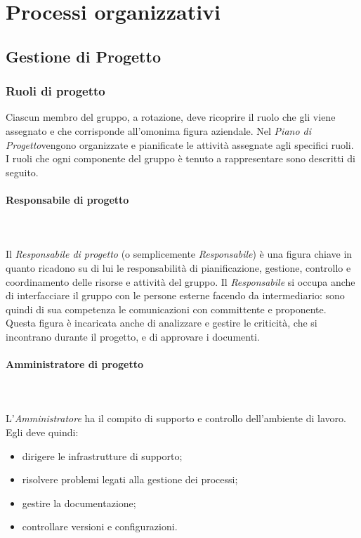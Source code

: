 \section{Processi organizzativi}

\subsection{Gestione di Progetto}

\subsubsection{Ruoli di progetto}
Ciascun membro del gruppo, a rotazione, deve ricoprire il ruolo che gli viene assegnato e che corrisponde all'omonima figura aziendale. Nel \textit{Piano di Progetto}\glo vengono organizzate e pianificate le attività assegnate agli specifici ruoli. I ruoli che ogni componente del gruppo è tenuto a rappresentare sono descritti di seguito.

\paragraph{Responsabile di progetto}\mbox{} \\ \mbox{} \\
Il \textit{Responsabile di progetto} (o semplicemente \textit{Responsabile}) è una figura chiave in quanto ricadono su di lui le responsabilità di pianificazione, gestione, controllo e coordinamento delle risorse e attività del gruppo. Il \textit{Responsabile} si occupa anche di interfacciare il gruppo con le persone esterne facendo da intermediario: sono quindi di sua competenza le comunicazioni con committente e proponente.
Questa figura è incaricata anche di analizzare e gestire le criticità, che si incontrano durante il progetto, e di approvare i documenti.

\paragraph{Amministratore di progetto}\mbox{} \\ \mbox{} \\
L'\textit{Amministratore} ha il compito di supporto e controllo dell'ambiente di lavoro.
Egli deve quindi:
\begin{itemize}
	\item dirigere le infrastrutture di supporto;
	\item risolvere problemi legati alla gestione dei processi;
	\item gestire la documentazione;
	\item controllare versioni e configurazioni.
\end{itemize}

